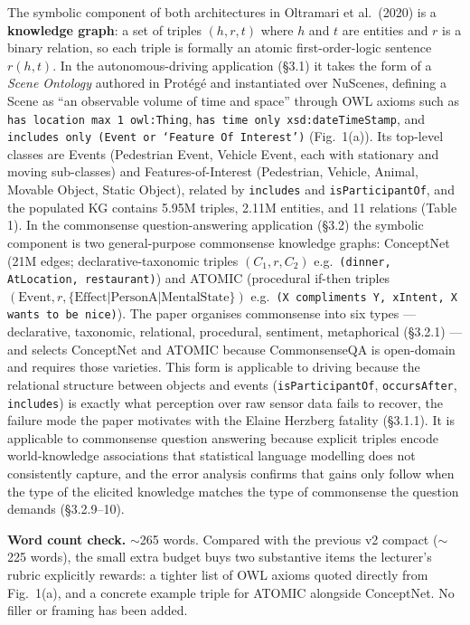 \documentclass[11pt, a4paper]{article}
\begin{document}
\begin{prosebox}[(compact)]
The symbolic component of both architectures in Oltramari et al.\ (2020) is a \textbf{knowledge graph}: a set of triples \((h, r, t)\) where \(h\) and \(t\) are entities and \(r\) is a binary relation, so each triple is formally an atomic first-order-logic sentence \(r(h, t)\). In the autonomous-driving application (§3.1) it takes the form of a \emph{Scene Ontology} authored in Protégé and instantiated over NuScenes, defining a Scene as ``an observable volume of time and space'' through OWL axioms such as \texttt{has location max 1 owl:Thing}, \texttt{has time only xsd:dateTimeStamp}, and \texttt{includes only (Event or `Feature Of Interest')} (Fig.\ 1(a)). Its top-level classes are Events (Pedestrian Event, Vehicle Event, each with stationary and moving sub-classes) and Features-of-Interest (Pedestrian, Vehicle, Animal, Movable Object, Static Object), related by \texttt{includes} and \texttt{isParticipantOf}, and the populated KG contains 5.95M triples, 2.11M entities, and 11 relations (Table 1). In the commonsense question-answering application (§3.2) the symbolic component is two general-purpose commonsense knowledge graphs: ConceptNet (21M edges; declarative-taxonomic triples \((C_1, r, C_2)\) e.g.\ \texttt{(dinner, AtLocation, restaurant)}) and ATOMIC (procedural if-then triples \((\mathrm{Event}, r, \{\mathrm{Effect|PersonA|MentalState}\})\) e.g.\ \texttt{(X compliments Y, xIntent, X wants to be nice)}). The paper organises commonsense into six types — declarative, taxonomic, relational, procedural, sentiment, metaphorical (§3.2.1) — and selects ConceptNet and ATOMIC because CommonsenseQA is open-domain and requires those varieties. This form is applicable to driving because the relational structure between objects and events (\texttt{isParticipantOf}, \texttt{occursAfter}, \texttt{includes}) is exactly what perception over raw sensor data fails to recover, the failure mode the paper motivates with the Elaine Herzberg fatality (§3.1.1). It is applicable to commonsense question answering because explicit triples encode world-knowledge associations that statistical language modelling does not consistently capture, and the error analysis confirms that gains only follow when the type of the elicited knowledge matches the type of commonsense the question demands (§3.2.9--10).
\end{prosebox}

\textbf{Word count check.} $\sim$265 words. Compared with the previous v2 compact ($\sim$225 words), the small extra budget buys two substantive items the lecturer's rubric explicitly rewards: a tighter list of OWL axioms quoted directly from Fig.\ 1(a), and a concrete example triple for ATOMIC alongside ConceptNet. No filler or framing has been added.
\end{document}
